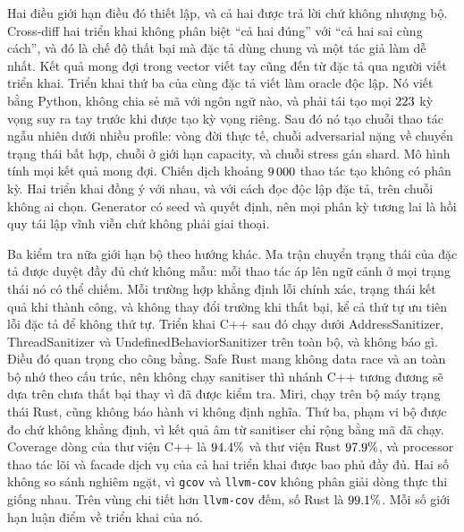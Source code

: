Hai điều giới hạn điều đó thiết lập, và cả hai được trả lời chứ không nhượng bộ. Cross-diff hai triển khai không phân biệt ``cả hai đúng'' với ``cả hai sai
cùng cách'', và đó là chế độ thất bại mà đặc tả dùng chung và một tác giả làm
dễ nhất. Kết quả mong đợi trong vector viết tay cũng đến từ
đặc tả qua người viết triển khai. Triển khai thứ ba của
cùng đặc tả viết làm oracle độc lập. Nó viết bằng Python,
không chia sẻ mã với ngôn ngữ nào, và phải tái tạo mọi $223$ kỳ vọng
suy ra tay trước khi được tạo kỳ vọng riêng. Sau đó nó tạo chuỗi thao tác ngẫu nhiên
dưới nhiều profile: vòng đời thực tế, chuỗi adversarial
nặng về chuyển trạng thái bất hợp, chuỗi ở giới hạn capacity, và chuỗi
stress gán shard. Mô hình tính mọi kết quả mong đợi. Chiến dịch
khoảng $9\,000$ thao tác tạo không có phân kỳ. Hai
triển khai đồng ý với nhau, và với cách đọc độc lập đặc tả, trên
chuỗi không ai chọn. Generator có seed và quyết định, nên mọi phân kỳ tương lai là
hồi quy tái lập vĩnh viễn chứ không phải giai thoại.

Ba kiểm tra nữa giới hạn bộ theo hướng khác. Ma trận chuyển trạng thái của đặc tả
được duyệt đầy đủ chứ không mẫu: mỗi thao tác áp lên ngữ cảnh ở
mọi trạng thái nó có thể chiếm. Mỗi trường hợp khẳng định lỗi chính xác, trạng thái kết quả khi thành công, và
không thay đổi trường khi thất bại, kể cả thứ tự ưu tiên lỗi đặc tả
để không thứ tự. Triển khai C++ sau đó chạy dưới AddressSanitizer, ThreadSanitizer
và UndefinedBehaviorSanitizer trên toàn bộ, và không báo gì. Điều đó quan trọng cho
công bằng. Safe Rust mang không data race và an toàn bộ nhớ theo cấu trúc, nên không
chạy sanitiser thì nhánh C++ tương đương sẽ dựa trên chưa thất bại thay vì
đã được kiểm tra. Miri, chạy trên bộ máy trạng thái Rust, cũng không báo
hành vi không định nghĩa. Thứ ba, phạm vi bộ được đo chứ không khẳng định, vì
kết quả âm từ sanitiser chỉ rộng bằng mã đã chạy. Coverage dòng của
thư viện C++ là $94.4\%$ và thư viện Rust $97.9\%$, và processor thao tác lõi
và facade dịch vụ của cả hai triển khai được bao phủ đầy đủ. Hai số không
so sánh nghiêm ngặt, vì \texttt{gcov} và \texttt{llvm-cov} không phân giải dòng thực thi giống nhau.
Trên vùng chi tiết hơn \texttt{llvm-cov} đếm, số Rust là $99.1\%$.
Mỗi số giới hạn luận điểm về triển khai của nó.
